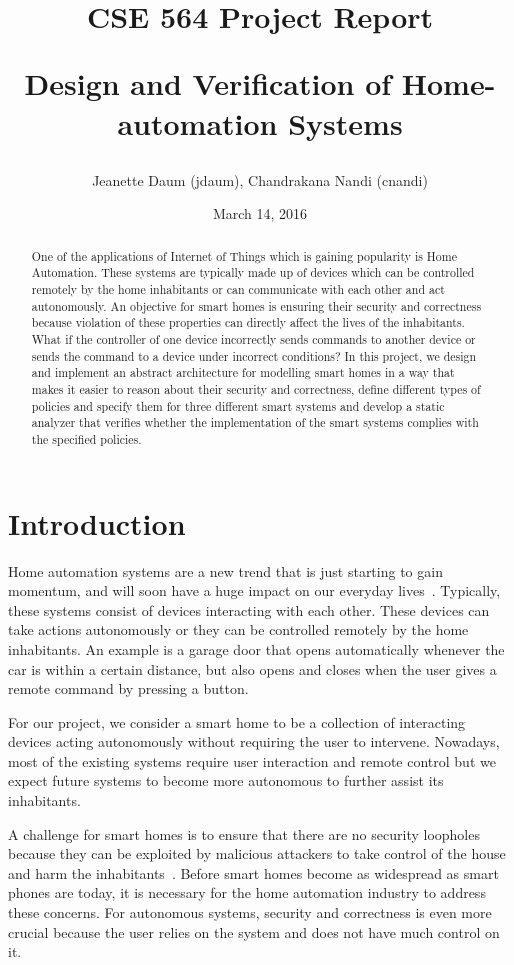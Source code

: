 \documentclass{article}
\title{\textbf{CSE 564 Project Report} 
\\
\begin{center}
\LARGE{Design and Verification of Home-automation Systems}
\end{center}\vspace{-2ex}}
\author{Jeanette Daum (jdaum), Chandrakana Nandi (cnandi) }
\date{March 14, 2016}
\begin{document}
\maketitle
\begin{abstract}
One of the applications of Internet of Things which is gaining popularity is Home Automation. These systems are typically made up of devices which can be controlled remotely by the home inhabitants or can communicate with each other and act autonomously. An objective for smart homes is ensuring their security and correctness because violation of these properties can directly affect the lives of the inhabitants. What if the controller of one device incorrectly sends commands to another device or sends the command to a device under incorrect conditions? In this project, we design and implement an abstract architecture for modelling smart homes in a way that makes it easier to reason about their security and correctness, define different types of policies and specify them for three different smart systems and develop a static analyzer that verifies whether the implementation of the smart systems complies with the specified policies. 

\end{abstract}
\section{Introduction}
Home automation systems are a new trend that is just starting to gain momentum, and will soon have a huge impact on our everyday lives~\cite{samsung, homekit, echo, wink, homeos}. Typically, these systems consist of devices interacting with each other. These devices can take actions autonomously or they can be controlled remotely by the home inhabitants. An example is a garage door that opens automatically whenever the car is within a certain distance, but also opens and closes when the user gives a remote command by pressing a button. 

For our project, we consider a smart home to be a collection of interacting devices acting autonomously without requiring the user to intervene. Nowadays, most of the existing systems require user interaction and remote control but we expect future systems to become more autonomous to further assist its inhabitants.

A challenge for smart homes is to ensure that there are no security loopholes because they can be exploited by malicious attackers to take control of the house and harm the inhabitants~\cite{yoshi, jung}. Before smart homes become as widespread as smart phones are today, it is necessary for the home automation industry to address these concerns. For autonomous systems, security and correctness is even more crucial because the user relies on the system and does not have much control on it. 
\end{document}
